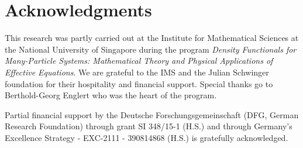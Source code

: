 \documentclass[10pt]{amsart}
\theoremstyle{definition}
\begin{document}
\section*{Acknowledgments}

This research was partly carried out at the Institute for Mathematical Sciences at the National University of Singapore during the program
\emph{Density Functionals for Many-Particle Systems: Mathematical Theory and Physical Applications of Effective Equations}. We are grateful to the IMS and the Julian Schwinger foundation for their hospitality and financial support. Special thanks go to Berthold-Georg Englert who was the heart of the program.


Partial financial support by the Deutsche Forschungsgemeinschaft (DFG, German Research Foundation) through grant SI 348/15-1 (H.S.) and through Germany's Excellence Strategy - EXC-2111 - 390814868 (H.S.) is gratefully acknowledged.


\end{document}
